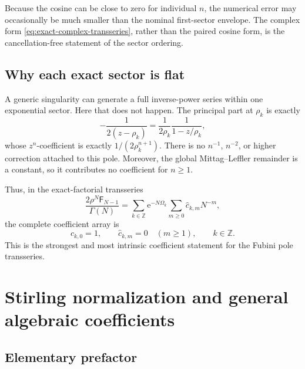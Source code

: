 \documentclass[11pt,oneside]{article}
\numberwithin{equation}{section}
\newcommand{\e}{\mathrm e}
\newcommand{\Z}{\mathbb Z}
\newcommand{\Fub}{\mathsf F}
\begin{document}
Because the cosine can be close to zero for individual \(n\), the numerical error may occasionally be much smaller than the nominal first-sector envelope.  The complex form \cref{eq:exact-complex-transseries}, rather than the paired cosine form, is the cancellation-free statement of the sector ordering.

\subsection{Why each exact sector is flat}

A generic singularity can generate a full inverse-power series within one exponential sector.  Here that does not happen.  The principal part at \(\rho_k\) is exactly
\[
 -\frac{1}{2(z-\rho_k)}
 =\frac{1}{2\rho_k}\frac{1}{1-z/\rho_k},
\]
whose \(z^n\)-coefficient is exactly \(1/(2\rho_k^{n+1})\).  There is no \(n^{-1}\), \(n^{-2}\), or higher correction attached to this pole.  Moreover, the global Mittag--Leffler remainder is a constant, so it contributes no coefficient for \(n\ge1\).

Thus, in the exact-factorial transseries
\begin{equation}
 \frac{2\rho^N\Fub_{N-1}}{\Gamma(N)}
 =\sum_{k\in\Z}\e^{-N\Omega_k}
   \sum_{m\ge0}\widehat c_{k,m}N^{-m},
 \label{eq:exact-factorial-coeff-array}
\end{equation}
the complete coefficient array is
\begin{equation}
 \boxed{\displaystyle
 \widehat c_{k,0}=1,
 \qquad
 \widehat c_{k,m}=0\quad(m\ge1),
 \qquad k\in\Z.}
 \label{eq:flat-sector-coefficients}
\end{equation}
This is the strongest and most intrinsic coefficient statement for the Fubini pole transseries.

\section{Stirling normalization and general algebraic coefficients}
\label{sec:coefficients}

\subsection{Elementary prefactor}
\end{document}

